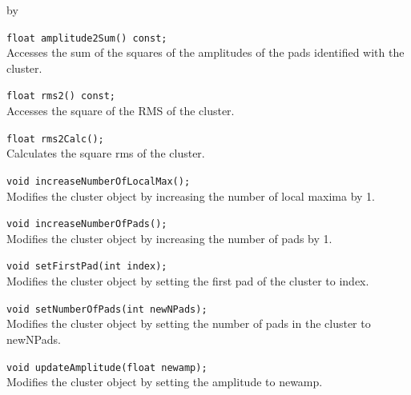 \documentclass[twoside]{article}
\newcommand{\entrylabel}[1]{\mbox{\textbf{{#1}}}\hfil}%
\newenvironment{entry}
{\begin{list}{}%
    {\renewcommand{\makelabel}{\entrylabel}%
     \setlength{\labelwidth}{90pt}%
     \setlength{\leftmargin}{\labelwidth}
     \advance\leftmargin by \labelsep%
      }%
    }%
  {\end{list}}
\newcommand{\Entrylabel}[1]%
{\raisebox{0pt}[1ex][0pt]{\makebox[\labelwidth][l]%
    {\parbox[t]{\labelwidth}{\hspace{0pt}\textbf{{#1}}}}}}
\newenvironment{Entry}%
{\renewcommand{\entrylabel}{\Entrylabel}\begin{entry}}%
  {\end{entry}}
\begin{document}
\begin{Entry}
    \verb+float amplitude2Sum() const;+\\
    Accesses the sum of the squares of the amplitudes of the pads
    identified with the cluster.

    \verb+float rms2() const;+\\
    Accesses the square of the RMS of the cluster.

    \verb+float rms2Calc();+\\
    Calculates the square rms of the cluster.

    \verb+void increaseNumberOfLocalMax();+\\
    Modifies the cluster object by increasing the number
    of local maxima by 1.

    \verb+void increaseNumberOfPads();+\\
    Modifies the cluster object by increasing the number
    of pads by 1.    

    \verb+void setFirstPad(int index);+\\
    Modifies the cluster object by setting the first pad
    of the cluster to index.

    \verb+void setNumberOfPads(int newNPads);+\\
    Modifies the cluster object by setting the number
    of pads in the cluster to newNPads.

    \verb+void updateAmplitude(float newamp);+\\
    Modifies the cluster object by setting the amplitude to
    newamp.
\end{Entry}
\clearpage
\end{document}
